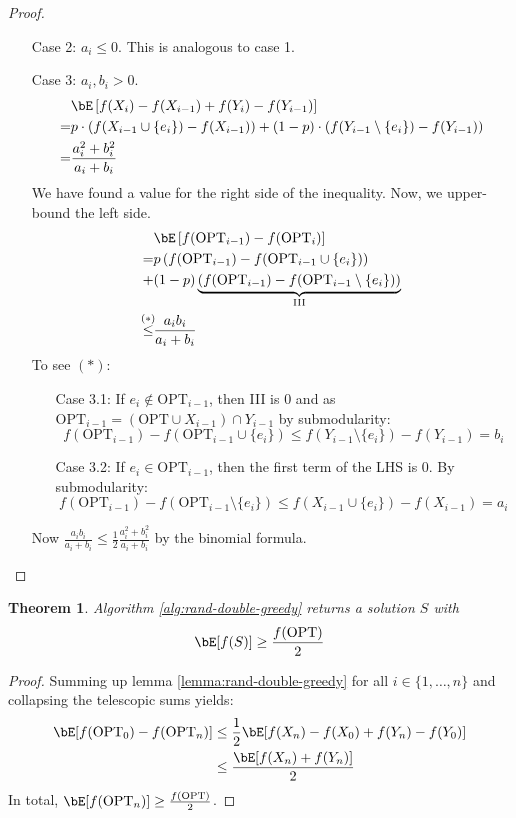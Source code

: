 \documentclass[11pt, a4paper]{article}
\newcommand{\mr}[1]{\mathrm{#1}}
\newcommand{\stackalign}[2]{\stackrel{\mathclap{#1}}{#2}}
\newcommand{\set}[1]{\{#1\}}
\newtheorem{theorem}{Theorem}[section]
\theoremstyle{remark}
\theoremstyle{definition}
\begin{document}
\begin{proof}
\begin{enumerate}
		\item[Case 2:] $a_i\leq 0$. This is analogous to case 1.
		\item[Case 3:] $a_i,b_i>0$.
		\begin{align*}
			  & \bE\left[f(X_i)-f(X_{i-1})+f(Y_i)-f(Y_{i-1})\right]         \\
			= & p\cdot\left(f(X_{i-1}\cup\set{e_i})-f(X_{i-1})\right)
			+(1-p)\cdot\left(f(Y_{i-1}\setminus\set{e_i})-f(Y_{i-1})\right) \\
			= & \frac{a_i^2+b_i^2}{a_i+b_i}
		\end{align*}
		We have found a value for the right side of the inequality. Now, we
		upper-bound the left side.
		\begin{align*}
			                       & \bE\left[f(\mr{OPT}_{i-1})-f(\mr{OPT}_i)\right]                                                 \\
			=                      & p\left(f(\mr{OPT}_{i-1})-f(\mr{OPT}_{i-1}\cup\set{e_i})\right)                                  \\
			+                      & (1-p)\underbrace{\left(f(\mr{OPT}_{i-1})-f(\mr{OPT}_{i-1}\setminus\set{e_i})\right)}_{\mr{III}} \\
			\stackalign{(*)}{\leq} & \frac{a_ib_i}{a_i+b_i}
		\end{align*}
		To see $(*)$:
		\begin{enumerate}
			\item[Case 3.1:] If $e_i\notin\mr{OPT}_{i-1}$, then III is 0 and as
			$\mr{OPT}_{i-1}=(\mr{OPT}\cup X_{i-1})\cap Y_{i-1}$ by submodularity:
			\[f(\mr{OPT}_{i-1})-f(\mr{OPT}_{i-1}\cup\set{e_i})\leq f(Y_{i-1}\setminus\set{e_i})-f(Y_{i-1})=b_i\]

			\item[Case 3.2:] If $e_i\in\mr{OPT}_{i-1}$, then the first term of the LHS
			is 0. By submodularity:
			\[f(\mr{OPT}_{i-1})-f(\mr{OPT}_{i-1}\setminus\set{e_i})\leq f(X_{i-1}\cup\set{e_i})-f(X_{i-1})=a_i\]
		\end{enumerate}
		Now $\frac{a_ib_i}{a_i+b_i}\leq\frac{1}{2}\frac{a_i^2+b_i^2}{a_i+b_i}$
		by the binomial formula.
	\end{enumerate}
\end{proof}

\begin{theorem}
	Algorithm \ref{alg:rand-double-greedy} returns a solution $S$ with
	\[\bE[f(S)]\geq \frac{f(\mr{OPT})}{2}\]
\end{theorem}
\begin{proof}
	Summing up lemma \ref{lemma:rand-double-greedy} for all $i\in\set{1,\ldots,n}$
	and collapsing the telescopic sums yields:
	\begin{align*}
		\bE[f(\mr{OPT}_0)-f(\mr{OPT}_n)] & \leq \frac{1}{2}\bE[f(X_n)-f(X_0)+f(Y_n)-f(Y_0)] \\
		                                 & \leq \frac{\bE[f(X_n)+f(Y_n)]}{2}
	\end{align*}
	In total, $\bE[f(\mr{OPT}_n)]\geq \frac{f(\mr{OPT})}{2}$.
\end{proof}
\end{document}
